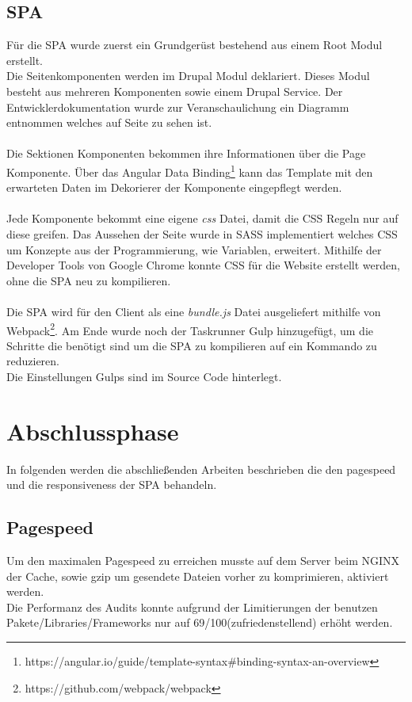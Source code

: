 \documentclass[11pt,a4paper]{article}
\begin{document}
\subsection{SPA}
Für die SPA wurde zuerst ein Grundgerüst bestehend aus einem Root Modul erstellt.\\
Die Seitenkomponenten werden im Drupal Modul deklariert.  Dieses Modul besteht aus mehreren Komponenten sowie einem Drupal Service. Der Entwicklerdokumentation wurde  zur Veranschaulichung ein Diagramm entnommen welches auf Seite  zu sehen ist. \\\\Die Sektionen Komponenten bekommen ihre Informationen über die Page Komponente. Über das Angular Data Binding\footnote{https://angular.io/guide/template-syntax\#binding-syntax-an-overview} kann das Template mit den erwarteten Daten im Dekorierer der Komponente eingepflegt werden.\\\\
Jede Komponente bekommt eine eigene \textit{css} Datei, damit die CSS Regeln nur auf diese greifen. Das Aussehen der Seite wurde in SASS implementiert welches CSS um Konzepte aus der Programmierung, wie Variablen, erweitert.
Mithilfe der Developer Tools von Google Chrome konnte CSS für die Website erstellt werden, ohne die SPA neu zu kompilieren.\\\\
Die SPA wird für den Client als eine \textit{bundle.js} Datei ausgeliefert mithilfe von Webpack\footnote{https://github.com/webpack/webpack}.
Am Ende wurde noch der Taskrunner Gulp hinzugefügt, um die Schritte die benötigt sind um die SPA zu kompilieren auf ein Kommando zu reduzieren. \\
Die Einstellungen Gulps sind im Source Code hinterlegt.
\section{Abschlussphase}
In folgenden werden die abschließenden Arbeiten beschrieben die den pagespeed und die responsiveness der SPA behandeln.
\subsection{Pagespeed}
Um den maximalen Pagespeed zu erreichen musste auf dem Server beim NGINX der Cache, sowie gzip um gesendete Dateien vorher zu komprimieren, aktiviert werden.\\ Die Performanz des Audits konnte aufgrund der Limitierungen der benutzen Pakete/Libraries/Frameworks nur auf 69/100(zufriedenstellend) erhöht werden. 
\end{document}
